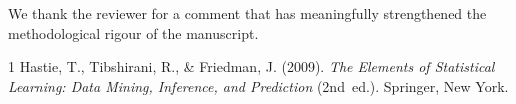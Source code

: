 \documentclass[11pt,a4paper]{article}
\begin{document}
\bigskip
\noindent We thank the reviewer for a comment that has meaningfully
strengthened the methodological rigour of the manuscript.

\begin{thebibliography}{1}
Hastie, T., Tibshirani, R., \& Friedman, J.
(2009).
\textit{The Elements of Statistical Learning: Data Mining, Inference,
and Prediction} (2nd~ed.).
Springer, New York.
\end{thebibliography}
\end{document}
